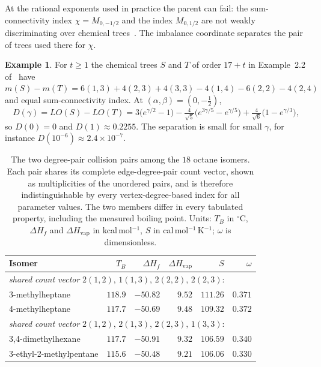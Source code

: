 \documentclass[a5paper, 10pt]{article}
\theoremstyle{plain}
\theoremstyle{remark}
\theoremstyle{definition}
\newtheorem{example}{Example}
\begin{document}
  At the rational exponents used in practice the parent can fail: the sum-connectivity index $\chi = M_{0,-1/2}$ and the index $M_{0,1/2}$ are not weakly discriminating over chemical trees~\cite[Example~2.2]{RadaRodriguezSigarreta2022Weak}. The imbalance coordinate separates the pair of trees used there for $\chi$.

  \begin{example}\label{ex:sumconn}
  For $t \ge 1$ the chemical trees $S$ and $T$ of order $17 + t$ in
  Example~2.2 of~\cite{RadaRodriguezSigarreta2022Weak} have
  $m(S) - m(T) = 6(1,3) + 4(2,3) + 4(3,3) - 4(1,4) - 6(2,2) - 4(2,4)$ and
  equal sum-connectivity index. At $(\alpha,\beta) = (0,-\tfrac12)$,
  \[
  D(\gamma) = LO(S) - LO(T) = 3\bigl(e^{\gamma/2} - 1\bigr)
  - \tfrac{4}{\sqrt5}\bigl(e^{3\gamma/5} - e^{\gamma/5}\bigr)
  + \tfrac{4}{\sqrt6}\bigl(1 - e^{\gamma/3}\bigr),
  \]
  so $D(0) = 0$ and $D(1) \approx 0.2255$. The separation is small for
  small $\gamma$, for instance $D(10^{-6}) \approx 2.4 \times 10^{-7}$.
  \end{example}

\begin{table}[htbp]
\centering
\caption{The two degree-pair collision pairs among the $18$ octane
isomers. Each pair shares its complete edge-degree-pair count vector,
shown as multiplicities of the unordered pairs, and is therefore
indistinguishable by every vertex-degree-based index for all
parameter values. The two members differ in every tabulated property, including the measured boiling point. Units: $T_B$ in
$^{\circ}$C, $\Delta H_f$ and $\Delta H_{\mathrm{vap}}$ in
kcal\,mol$^{-1}$, $S$ in cal\,mol$^{-1}$\,K$^{-1}$; $\omega$ is
dimensionless.}
\label{tab:collisions}
\small
\begin{tabular}{lrrrrr}
\toprule
Isomer & $T_B$ & $\Delta H_f$ & $\Delta H_{\mathrm{vap}}$ & $S$ & $\omega$\\
\midrule
\multicolumn{6}{l}{\emph{shared count vector} $2(1,2),\,1(1,3),\,2(2,2),\,2(2,3)$:}\\
3-methylheptane & $118.9$ & $-50.82$ & $9.52$ & $111.26$ & $0.371$\\
4-methylheptane & $117.7$ & $-50.69$ & $9.48$ & $109.32$ & $0.372$\\
\midrule
\multicolumn{6}{l}{\emph{shared count vector} $2(1,2),\,2(1,3),\,2(2,3),\,1(3,3)$:}\\
3,4-dimethylhexane & $117.7$ & $-50.91$ & $9.32$ & $106.59$ & $0.340$\\
3-ethyl-2-methylpentane & $115.6$ & $-50.48$ & $9.21$ & $106.06$ & $0.330$\\
\bottomrule
\end{tabular}
\end{table}
\end{document}
